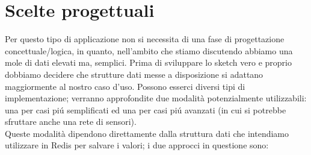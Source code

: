 \section{Scelte progettuali}
Per questo tipo di applicazione non si necessita di una fase di progettazione concettuale/logica, in quanto,
nell'ambito che stiamo discutendo abbiamo una mole di dati elevati ma, semplici.
Prima di sviluppare lo sketch vero e proprio dobbiamo decidere che strutture dati messe a disposizione si adattano
maggiormente al nostro caso d'uso.
Possono esserci diversi tipi di implementazione;
verranno approfondite due modalità potenzialmente utilizzabili:
una per casi piú semplificati ed una per casi piú avanzati (in cui si potrebbe sfruttare anche una rete di sensori).
\\
Queste modalità dipendono direttamente dalla struttura dati che intendiamo utilizzare in Redis per salvare i valori;
i due approcci in questione sono:
